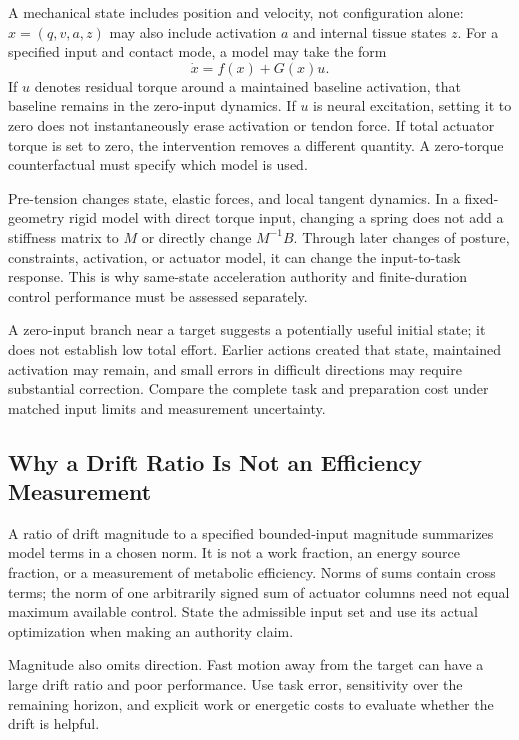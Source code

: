 A mechanical state includes position and velocity, not configuration alone:
$x=(q,v,a,z)$ may also include activation $a$ and internal tissue states $z$.
For a specified input and contact mode, a model may take the form
\begin{equation}
\dot x=f(x)+G(x)u.
\label{eq:golf_affine}
\end{equation}
If $u$ denotes residual torque around a maintained baseline activation, that
baseline remains in the zero-input dynamics. If $u$ is neural excitation,
setting it to zero does not instantaneously erase activation or tendon force.
If total actuator torque is set to zero, the intervention removes a different
quantity. A zero-torque counterfactual must specify which model is used.

Pre-tension changes state, elastic forces, and local tangent dynamics. In a
fixed-geometry rigid model with direct torque input, changing a spring does
not add a stiffness matrix to $M$ or directly change $M^{-1}B$. Through later
changes of posture, constraints, activation, or actuator model, it can change
the input-to-task response. This is why same-state acceleration authority and
finite-duration control performance must be assessed separately.

A zero-input branch near a target suggests a potentially useful initial state;
it does not establish low total effort. Earlier actions created that state,
maintained activation may remain, and small errors in difficult directions
may require substantial correction. Compare the complete task and preparation
cost under matched input limits and measurement uncertainty.

\subsection{Why a Drift Ratio Is Not an Efficiency Measurement}

A ratio of drift magnitude to a specified bounded-input magnitude summarizes
model terms in a chosen norm. It is not a work fraction, an energy source
fraction, or a measurement of metabolic efficiency. Norms of sums contain
cross terms; the norm of one arbitrarily signed sum of actuator columns need
not equal maximum available control. State the admissible input set and use
its actual optimization when making an authority claim.

Magnitude also omits direction. Fast motion away from the target can have a
large drift ratio and poor performance. Use task error, sensitivity over the
remaining horizon, and explicit work or energetic costs to evaluate whether
the drift is helpful.

